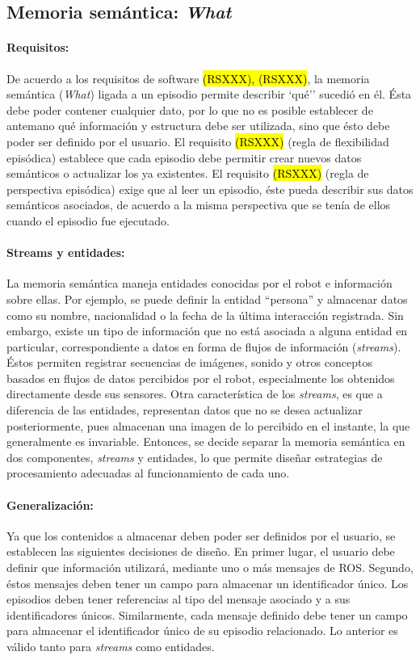 \subsection{Memoria semántica: \textit{What}}

\paragraph{Requisitos:}
De acuerdo a los requisitos de software \hl{(RSXXX), (RSXXX)}, la memoria semántica (\textit{What}) ligada a un episodio permite describir `qué'' sucedió en él. Ésta debe poder  contener cualquier dato, por lo que no es posible establecer de antemano qué información y estructura debe ser utilizada, sino que ésto debe poder ser definido por el usuario. El requisito \hl{(RSXXX)} (regla de flexibilidad episódica) establece que cada episodio debe permitir crear nuevos datos semánticos o actualizar los ya existentes. El requisito \hl{(RSXXX)} (regla de perspectiva episódica) exige que al leer un episodio, éste pueda describir sus datos semánticos asociados, de acuerdo a la misma perspectiva que se tenía de ellos cuando el episodio fue ejecutado.


\paragraph{Streams y entidades:} 
La memoria semántica maneja entidades conocidas por el robot e información sobre ellas. Por ejemplo, se puede definir la entidad ``persona'' y almacenar datos como su nombre, nacionalidad o la fecha de la última interacción registrada. Sin embargo, existe un tipo de información que no está asociada a alguna entidad en particular, correspondiente a datos en forma de flujos de información (\textit{streams}). Éstos permiten registrar secuencias de imágenes, sonido y otros conceptos basados en flujos de datos percibidos por el robot, especialmente los obtenidos directamente desde sus sensores. Otra característica de los \textit{streams}, es que a diferencia de las entidades, representan datos que no se desea actualizar posteriormente, pues almacenan una imagen de lo percibido en el instante, la que generalmente es invariable. Entonces, se decide separar la memoria semántica en dos componentes, \textit{streams} y entidades, lo que permite diseñar estrategias de procesamiento adecuadas al funcionamiento de cada uno.


\paragraph{Generalización:}
Ya que los contenidos a almacenar deben poder ser definidos por el usuario, se establecen las siguientes decisiones de diseño. En primer lugar, el usuario debe definir que información utilizará, mediante uno o más mensajes de ROS. Segundo, éstos mensajes deben tener un campo para almacenar un identificador único. Los episodios deben tener referencias al tipo del mensaje asociado y a sus identificadores únicos. Similarmente, cada mensaje definido debe tener un campo para almacenar el identificador único de su episodio relacionado. Lo anterior es válido tanto para \textit{streams} como entidades.

